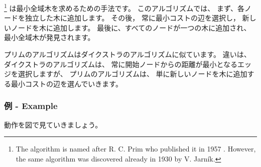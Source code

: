 
\footnote{The algorithm is
named after R. C. Prim who published it in 1957 \cite{pri57}.
However, the same algorithm was discovered already in 1930
by V. Jarník.} 
は最小全域木を求めるための手法です。
このアルゴリズムでは、
まず、各ノードを独立した木に追加します。
その後， 常に最小コストの辺を選択し，
新しいノードを木に追加します。
最後に、すべてのノードが一つの木に追加され、
最小全域木が発見されます。

プリムのアルゴリズムはダイクストラのアルゴリズムに似ています。
違いは、ダイクストラのアルゴリズムは、
常に開始ノードからの距離が最小となるエッジを選択しますが、
プリムのアルゴリズムは、
単に新しいノードを木に追加する最小コストの辺を選んでいきます。

\subsubsection{例 - Example}

動作を図で見ていきましょう。

